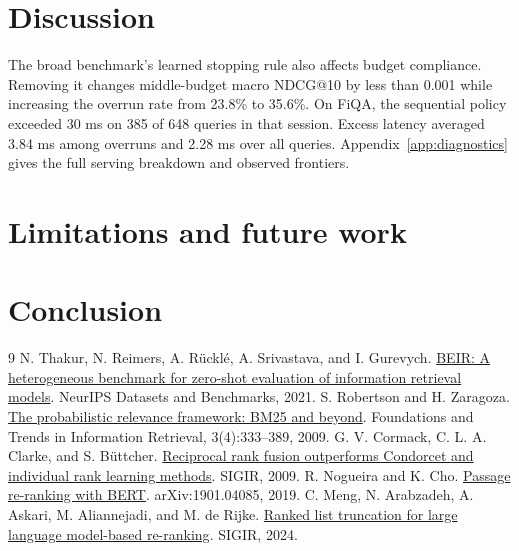 \documentclass{article}
\begin{document}
\FloatBarrier
\section{Discussion}


The broad benchmark's learned stopping rule also affects budget compliance. Removing it changes middle-budget macro NDCG@10 by less than 0.001 while increasing the overrun rate from 23.8\% to 35.6\%. On FiQA, the sequential policy exceeded 30 ms on 385 of 648 queries in that session. Excess latency averaged 3.84 ms among overruns and 2.28 ms over all queries. Appendix~\ref{app:diagnostics} gives the full serving breakdown and observed frontiers.

\section{Limitations and future work}


\section{Conclusion}


\begin{thebibliography}{9}
 N. Thakur, N. Reimers, A. R{\"u}ckl{\'e}, A. Srivastava, and I. Gurevych. \href{https://datasets-benchmarks-proceedings.neurips.cc/paper_files/paper/2021/file/65b9eea6e1cc6bb9f0cd2a47751a186f-Paper-round2.pdf}{BEIR: A heterogeneous benchmark for zero-shot evaluation of information retrieval models}. NeurIPS Datasets and Benchmarks, 2021.
 S. Robertson and H. Zaragoza. \href{https://doi.org/10.1561/1500000019}{The probabilistic relevance framework: BM25 and beyond}. Foundations and Trends in Information Retrieval, 3(4):333--389, 2009.
 G. V. Cormack, C. L. A. Clarke, and S. B{\"u}ttcher. \href{https://doi.org/10.1145/1571941.1572114}{Reciprocal rank fusion outperforms Condorcet and individual rank learning methods}. SIGIR, 2009.
 R. Nogueira and K. Cho. \href{https://arxiv.org/abs/1901.04085}{Passage re-ranking with BERT}. arXiv:1901.04085, 2019.
 C. Meng, N. Arabzadeh, A. Askari, M. Aliannejadi, and M. de Rijke. \href{https://arxiv.org/abs/2404.18185}{Ranked list truncation for large language model-based re-ranking}. SIGIR, 2024.
\end{thebibliography}

\appendix
\end{document}
